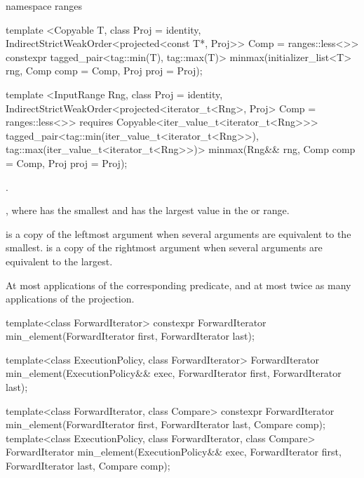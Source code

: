 \begin{addedblock}
%
\begin{itemdecl}
namespace ranges {
  template <Copyable T, class Proj = identity,
            IndirectStrictWeakOrder<projected<const T*, Proj>> Comp = ranges::less<>>
    constexpr tagged_pair<tag::min(T), tag::max(T)>
      minmax(initializer_list<T> rng, Comp comp = Comp{}, Proj proj = Proj{});

  template <InputRange Rng, class Proj = identity,
            IndirectStrictWeakOrder<projected<iterator_t<Rng>, Proj> Comp = ranges::less<>>
      requires Copyable<iter_value_t<iterator_t<Rng>>>
    tagged_pair<tag::min(iter_value_t<iterator_t<Rng>>), tag::max(iter_value_t<iterator_t<Rng>>)>
      minmax(Rng&& rng, Comp comp = Comp{}, Proj proj = Proj{});
}
\end{itemdecl}

\begin{itemdescr}
\pnum
\requires {}.

\pnum
\returns {}, where  has the smallest and  has the
largest value in the  or range.

\pnum
\remarks {} is a copy of the leftmost argument when several arguments are equivalent to
the smallest.  is a copy of the rightmost argument when several arguments are
equivalent to the largest.

\pnum
\complexity At most 
applications of the corresponding predicate, and at most twice as many applications of the projection.
\end{itemdescr}
\end{addedblock}

%
\begin{itemdecl}
template<class ForwardIterator>
  constexpr ForwardIterator min_element(ForwardIterator first, ForwardIterator last);

template<class ExecutionPolicy, class ForwardIterator>
  ForwardIterator min_element(ExecutionPolicy&& exec,
                              ForwardIterator first, ForwardIterator last);

template<class ForwardIterator, class Compare>
  constexpr ForwardIterator min_element(ForwardIterator first, ForwardIterator last,
                                        Compare comp);
template<class ExecutionPolicy, class ForwardIterator, class Compare>
  ForwardIterator min_element(ExecutionPolicy&& exec,
                              ForwardIterator first, ForwardIterator last,
                              Compare comp);
\end{itemdecl}

